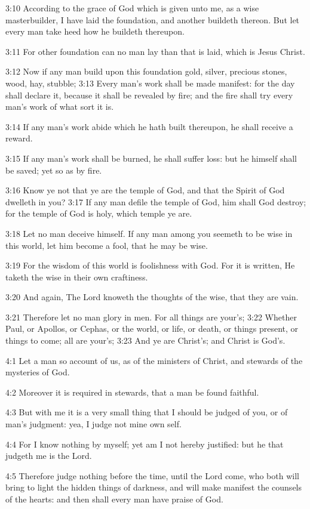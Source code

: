 3:10 According to the grace of God which is given unto me, as a wise
masterbuilder, I have laid the foundation, and another buildeth
thereon. But let every man take heed how he buildeth thereupon.

3:11 For other foundation can no man lay than that is laid, which is
Jesus Christ.

3:12 Now if any man build upon this foundation gold, silver, precious
stones, wood, hay, stubble; 3:13 Every man's work shall be made
manifest: for the day shall declare it, because it shall be revealed
by fire; and the fire shall try every man's work of what sort it is.

3:14 If any man's work abide which he hath built thereupon, he shall
receive a reward.

3:15 If any man's work shall be burned, he shall suffer loss: but he
himself shall be saved; yet so as by fire.

3:16 Know ye not that ye are the temple of God, and that the Spirit of
God dwelleth in you?  3:17 If any man defile the temple of God, him
shall God destroy; for the temple of God is holy, which temple ye are.

3:18 Let no man deceive himself. If any man among you seemeth to be
wise in this world, let him become a fool, that he may be wise.

3:19 For the wisdom of this world is foolishness with God. For it is
written, He taketh the wise in their own craftiness.

3:20 And again, The Lord knoweth the thoughts of the wise, that they
are vain.

3:21 Therefore let no man glory in men. For all things are your's;
3:22 Whether Paul, or Apollos, or Cephas, or the world, or life, or
death, or things present, or things to come; all are your's; 3:23 And
ye are Christ's; and Christ is God's.

4:1 Let a man so account of us, as of the ministers of Christ, and
stewards of the mysteries of God.

4:2 Moreover it is required in stewards, that a man be found faithful.

4:3 But with me it is a very small thing that I should be judged of
you, or of man's judgment: yea, I judge not mine own self.

4:4 For I know nothing by myself; yet am I not hereby justified: but
he that judgeth me is the Lord.

4:5 Therefore judge nothing before the time, until the Lord come, who
both will bring to light the hidden things of darkness, and will make
manifest the counsels of the hearts: and then shall every man have
praise of God.

